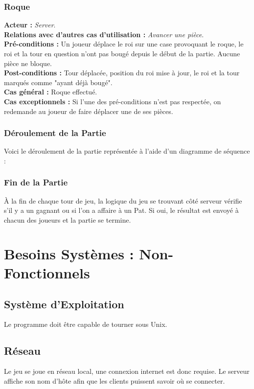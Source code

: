 \documentclass[10pt, a4paper]{article}
\begin{document}
\subsubsection{Roque}
\textbf{Acteur :} \textit{Server}. \\
\textbf{Relations avec d'autres cas d'utilisation :} {\itshape Avancer une pièce}. \\
\textbf{Pré-conditions :} Un joueur déplace le roi sur une case provoquant le roque, le roi et la tour en question n'ont pas bougé depuis le début de la partie. Aucune pièce ne bloque. \\
\textbf{Post-conditions :} Tour déplacée, position du roi mise à jour, le roi et la tour marqués comme "ayant déjà bougé". \\
\textbf{Cas général :} Roque effectué. \\
\textbf{Cas exceptionnels :} Si l'une des pré-conditions n'est pas respectée, on redemande au joueur de faire déplacer une de ses pièces. \\


\subsubsection{Déroulement de la Partie}
Voici le déroulement de la partie représentée à l'aide d'un diagramme de séquence : \\


\subsubsection{Fin de la Partie}
À la fin de chaque tour de jeu, la logique du jeu se trouvant côté serveur vérifie s'il y a un gagnant ou si l'on a affaire à un Pat. Si oui, le résultat est envoyé à chacun des joueurs et la partie se termine.


\section{Besoins Systèmes : Non-Fonctionnels}


\subsection{Système d'Exploitation}
Le programme doit être capable de tourner sous Unix. \\

\subsection{Réseau}
Le jeu se joue en réseau local, une connexion internet est donc requise. Le serveur affiche son nom d'hôte afin que les clients puissent savoir où se connecter. \\
\end{document}
